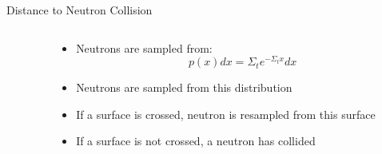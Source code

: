 \documentclass[serif]{beamer}
\begin{document}

\begin{frame}{Distance to Neutron Collision}

\begin{columns}
\begin{column}{0.5\linewidth}
\end{column}
\begin{column}{0.5\linewidth}

  \begin{itemize}
    \item Neutrons are sampled from:
    \[ p(x)dx = \Sigma_t e^{-\Sigma_t x}dx\]
    \vfill
    \item Neutrons are sampled from this distribution\vfill
    \item If a surface is crossed, neutron is resampled from this surface\vfill
    \item If a surface is not crossed, a neutron has collided
  \end{itemize}

\end{column}
\end{columns}

\end{frame}

\end{document}
